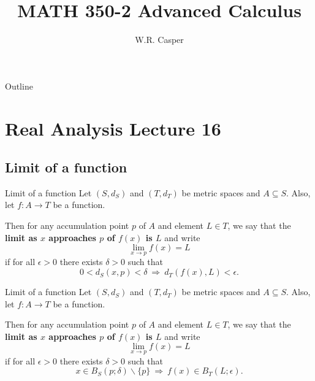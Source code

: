 \documentclass{beamer}
\title{MATH 350-2 Advanced Calculus}
\subtitle
{} %
\author[W.R. Casper] %
{W.R. Casper}
\institute[California State University Fullerton] %
{
  Department of Mathematics\\
  California State University Fullerton}
\begin{document}
\begin{frame}
  \titlepage
\end{frame}

\begin{frame}{Outline}
  \tableofcontents
\end{frame}



\section{Real Analysis Lecture 16}

\subsection{Limit of a function}

\begin{frame}{Limit of a function}
Let $(S,d_S)$ and $(T,d_T)$ be metric spaces and $A\subseteq S$.
\pause
Also, let $f: A\rightarrow T$ be a function.
\pause
\begin{defn}
\pause
Then for any accumulation point $p$ of $A$ and element $L\in T$, we say that the \textbf{limit as $x$ approaches $p$ of $f(x)$ is $L$}
\pause
 and write
$$\lim_{x\rightarrow p} f(x) = L$$
\pause
if for all $\epsilon > 0$ there exists $\delta > 0$ such that
$$0 < d_S(x,p) < \delta\ \Rightarrow\ d_T(f(x),L) < \epsilon.$$
\end{defn}
\end{frame}

\begin{frame}{Limit of a function}
Let $(S,d_S)$ and $(T,d_T)$ be metric spaces and $A\subseteq S$.
\pause
Also, let $f: A\rightarrow T$ be a function.
\pause
\begin{defn}
\pause
Then for any accumulation point $p$ of $A$ and element $L\in T$, we say that the \textbf{limit as $x$ approaches $p$ of $f(x)$ is $L$}
\pause
 and write
$$\lim_{x\rightarrow p} f(x) = L$$
\pause
if for all $\epsilon > 0$ there exists $\delta > 0$ such that
$$x\in B_S(p;\delta)\backslash\{p\}\ \Rightarrow\ f(x)\in B_T(L;\epsilon).$$
\end{defn}
\end{frame}
\end{document}
